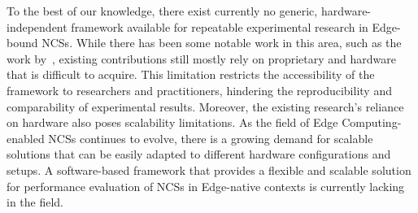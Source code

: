 To the best of our knowledge, there exist currently no generic, hardware-independent framework available for repeatable experimental research in Edge-bound \glspl{NCS}.
While there has been some notable work in this area, such as the work by~\cite{zoppi2020ncsbench}, existing contributions still mostly rely on proprietary and hardware that is difficult to acquire.
This limitation restricts the accessibility of the framework to researchers and practitioners, hindering the reproducibility and comparability of experimental results.
Moreover, the existing research's reliance on hardware also poses scalability limitations.
As the field of Edge Computing-enabled \glspl{NCS} continues to evolve, there is a growing demand for scalable solutions that can be easily adapted to different hardware configurations and setups.
A software-based framework that provides a flexible and scalable solution for performance evaluation of \glspl{NCS} in Edge-native contexts is currently lacking in the field.
